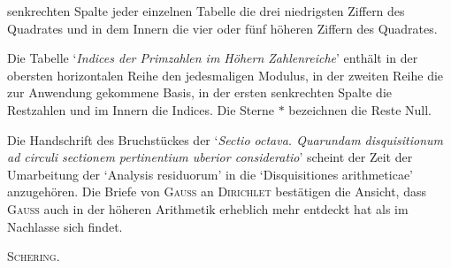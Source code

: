 senkrechten Spalte jeder einzelnen Tabelle die drei niedrigsten Ziffern des Quadrates und in dem Innern die vier oder fünf höheren Ziffern des Quadrates.
\par Die Tabelle ‘\textit{Indices der Primzahlen im Höhern Zahlenreiche}’ enthält in der obersten horizontalen Reihe den jedesmaligen Modulus, in der zweiten Reihe die zur Anwendung gekommene Basis, in der ersten senkrechten Spalte die Restzahlen und im Innern die Indices. Die Sterne $*$ bezeichnen die Reste Null.
\par Die Handschrift des Bruchstückes der ‘\textit{Sectio octava. Quarundam disquisitionum ad circuli sectionem pertinentium uberior consideratio}’ scheint der Zeit der Umarbeitung der ‘Analysis residuorum’ in die ‘Disquisitiones arithmeticae’ anzugehören. Die Briefe von \textsc{Gauss} an \textsc{Dirichlet} bestätigen die Ansicht, dass \textsc{Gauss} auch in der höheren Arithmetik erheblich mehr entdeckt hat als im Nachlasse sich findet.
\begin{flushright}\textsc{Schering}.\end{flushright}
